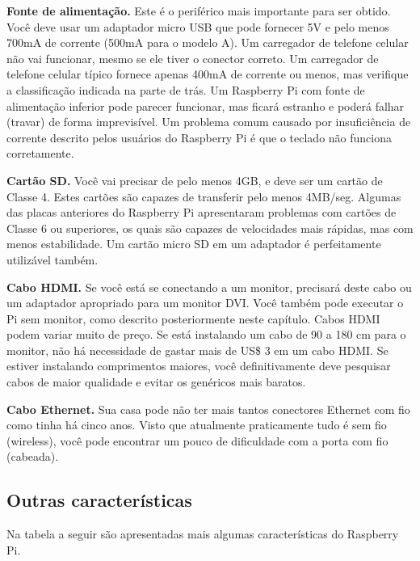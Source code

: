 \textbf{Fonte de alimentação.} Este é o periférico mais importante para ser obtido. Você deve usar um adaptador micro USB que pode fornecer 5V e pelo menos 700mA de corrente (500mA para o modelo A). Um carregador de telefone celular não vai funcionar, mesmo se ele tiver o conector correto. Um carregador de telefone celular típico fornece apenas 400mA de corrente ou menos, mas verifique a classificação indicada na parte de trás. Um Raspberry Pi com fonte de alimentação inferior pode parecer funcionar, mas ficará estranho e poderá falhar (travar) de forma imprevisível. Um problema comum causado por insuficiência de corrente descrito pelos usuários do Raspberry Pi é que o teclado não funciona corretamente.

\textbf{Cartão SD.} Você vai precisar de pelo menos 4GB, e deve ser um cartão de Classe 4. Estes cartões são capazes de transferir pelo menos 4MB/seg. Algumas das placas anteriores do Raspberry Pi apresentaram problemas com cartões de Classe 6 ou superiores, os quais são capazes de velocidades mais rápidas, mas com menos estabilidade. Um cartão micro SD em um adaptador é perfeitamente utilizável também.

\textbf{Cabo HDMI.} Se você está se conectando a um monitor, precisará deste cabo ou um adaptador apropriado para um monitor DVI. Você também pode executar o Pi sem monitor, como descrito posteriormente neste capítulo. Cabos HDMI podem variar muito de preço. Se está instalando um cabo de 90 a 180 cm para o monitor, não há necessidade de gastar mais de US\$ 3 em um cabo HDMI. Se estiver instalando comprimentos maiores, você definitivamente deve pesquisar cabos de maior qualidade e evitar os genéricos mais baratos.

\textbf{Cabo Ethernet.} Sua casa pode não ter mais tantos conectores Ethernet com fio como tinha há cinco anos. Visto que atualmente praticamente tudo é sem fio (wireless), você pode encontrar um pouco de dificuldade com a porta com fio (cabeada).

\subsection{Outras características}

Na tabela a seguir são apresentadas mais algumas características do Raspberry Pi.

